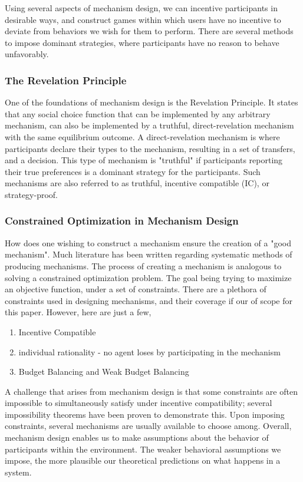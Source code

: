 \documentclass[12pt, titlepage, twocolumn]{report}
\begin{document}
Using several aspects of mechanism design, we can incentive participants in desirable ways, and construct games within which users have no incentive to deviate from behaviors we wish for them to perform. There are several methods to impose dominant strategies, where participants have no reason to behave unfavorably.


\subsubsection{The Revelation Principle}
\indent
One of the foundations of mechanism design is the Revelation Principle. It states that any social choice function that can be implemented by any arbitrary mechanism, can also be implemented by a truthful, direct-revelation mechanism with the same equilibrium outcome. A direct-revelation mechanism is where participants declare their types to the mechanism, resulting in a set of transfers, and a decision. This type of mechanism is "truthful" if participants reporting their true preferences is a dominant strategy for the participants. Such mechanisms are also referred to as truthful, incentive compatible (IC), or strategy-proof. 


\subsubsection{Constrained Optimization in Mechanism Design}
\indent

How does one wishing to construct a mechanism ensure the creation of a "good mechanism". Much literature has been written regarding systematic methods of producing mechanisms. The process of creating a mechanism is analogous to solving a constrained optimization problem. The goal being trying to maximize an objective function, under a set of constraints. There are a plethora of constraints used in designing mechanisms, and their coverage if our of scope for this paper. However, here are just a few,

\begin{enumerate}
	\item Incentive Compatible
	\item individual rationality - no agent loses by participating in the mechanism
	\item Budget Balancing and Weak Budget Balancing
\end{enumerate}

A challenge that arises from mechanism design is that some constraints are often impossible to simultaneously satisfy under incentive compatibility; several impossibility theorems have been proven to demonstrate this. Upon imposing constraints, several mechanisms are usually available to choose among. Overall, mechanism design enables us to make assumptions about the behavior of participants within the environment. The weaker behavioral assumptions we impose, the more plausible our theoretical predictions on what happens in a system.
\end{document}

